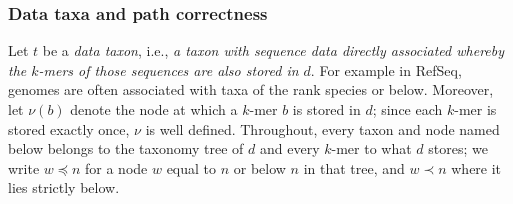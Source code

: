 \documentclass[pdflatex,sn-vancouver-num]{sn-jnl}
\begin{document}

\subsubsection{Data taxa and path correctness}\label{pathcorrectness}
    Let $t$ be a \emph{data taxon}, i.e., \emph{a taxon with sequence data directly associated whereby the $k$-mers of those sequences are also stored in $d$}. For example in RefSeq, genomes are often associated with taxa of the rank species or below. Moreover, let $\nu(b)$ denote the node at which a $k$-mer $b$ is stored in $d$; since each $k$-mer is stored exactly once, $\nu$ is well defined. Throughout, every taxon and node named below belongs to the taxonomy tree of $d$ and every $k$-mer to what $d$ stores; we write $w \preceq n$ for a node $w$ equal to $n$ or below $n$ in that tree, and $w \prec n$ where it lies strictly below.
\end{document}
